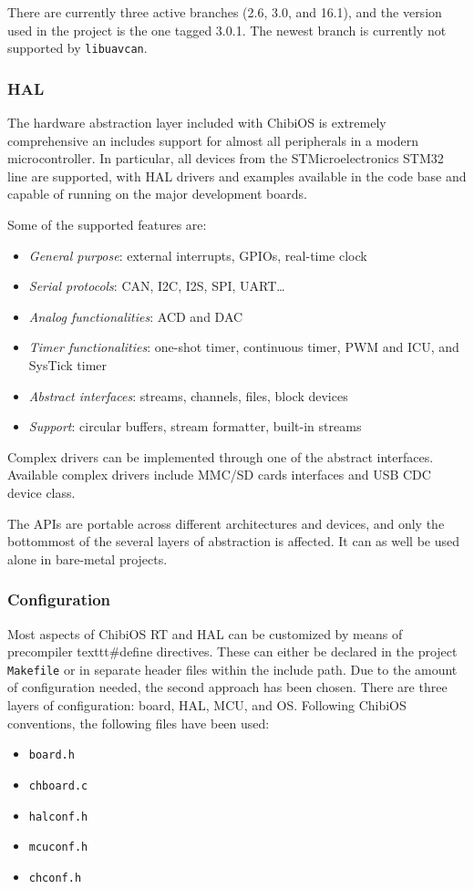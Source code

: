 There are currently three active branches (2.6, 3.0, and 16.1), and the version used in the project is the one tagged 3.0.1.
The newest branch is currently not supported by \texttt{libuavcan}.


\subsubsection{HAL}
The hardware abstraction layer included with ChibiOS is extremely comprehensive an includes support for almost all peripherals in a modern microcontroller.
In particular, all devices from the STMicroelectronics STM32 line are supported, with HAL drivers and examples available in the code base and capable of running on the major development boards.

Some of the supported features are:
\begin{itemize}
    \item \emph{General purpose}: external interrupts, GPIOs, real-time clock
    \item \emph{Serial protocols}: CAN, I2C, I2S, SPI, UART\dots
    \item \emph{Analog functionalities}: ACD and DAC
    \item \emph{Timer functionalities}: one-shot timer, continuous timer, PWM and ICU, and SysTick timer
    \item \emph{Abstract interfaces}: streams, channels, files, block devices
    \item \emph{Support}: circular buffers, stream formatter, built-in streams
\end{itemize}
Complex drivers can be implemented through one of the abstract interfaces.
Available complex drivers include MMC/SD cards interfaces and USB CDC device class.

The APIs are portable across different architectures and devices, and only the bottommost of the several layers of abstraction is affected.
It can as well be used alone in bare-metal projects.


\subsubsection{Configuration}
Most aspects of ChibiOS RT and HAL can be customized by means of precompiler texttt{\#define} directives.
These can either be declared in the project \texttt{Makefile} or in separate header files within the include path.
Due to the amount of configuration needed, the second approach has been chosen.
There are three layers of configuration: board, HAL, MCU, and OS.
Following ChibiOS conventions, the following files have been used:
\begin{itemize}
    \item \texttt{board.h}
    \item \texttt{chboard.c}
    \item \texttt{halconf.h}
    \item \texttt{mcuconf.h}
    \item \texttt{chconf.h}
\end{itemize}

